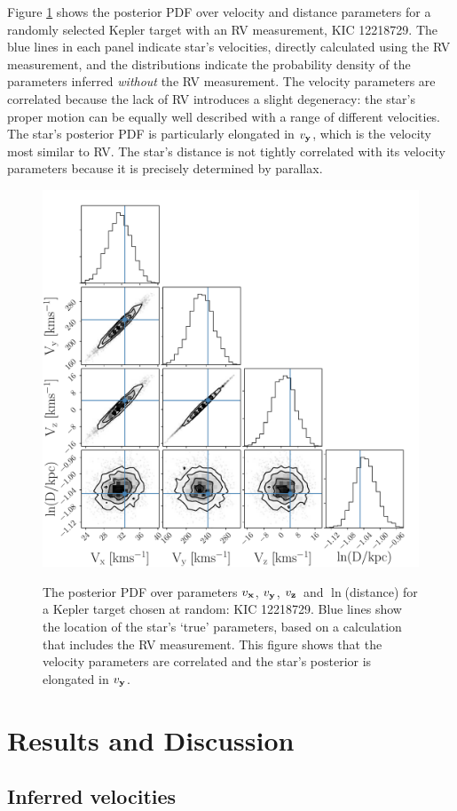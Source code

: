 \documentclass[]{aastex631}
\newcommand{\vx}{$v_{\bf x}$}
\newcommand{\vy}{$v_{\bf y}$}
\newcommand{\vz}{$v_{\bf z}$}
\newcommand{\kicstar}{12218729}
\begin{document}
Figure \ref{fig:posterior} shows the posterior PDF over velocity and distance
parameters for a randomly selected Kepler target with an RV measurement, KIC
\kicstar.
The blue lines in each panel indicate star's velocities, directly calculated
using the RV measurement, and the distributions indicate the probability
density of the parameters inferred {\it without} the RV measurement.
The velocity parameters are correlated because the lack of RV introduces a
slight degeneracy: the star's proper motion can be equally well described with
a range of different velocities.
The star's posterior PDF is particularly elongated in \vy, which is the
velocity most similar to RV.
The star's distance is not tightly correlated with its velocity parameters
because it is precisely determined by parallax.
\begin{figure}[ht!]
\caption{
The posterior PDF over parameters \vx, \vy, \vz\ and $\ln$(distance) for a
    Kepler target chosen at random: KIC \kicstar.
    Blue lines show the location of the star's `true' parameters, based on a
    calculation that includes the RV measurement.
This figure shows that the velocity parameters are correlated and the star's
    posterior is elongated in \vy.
    }
  \centering
    \includegraphics[width=.7\textwidth]{posterior}
\label{fig:posterior}
\end{figure}

\section{Results and Discussion}
\label{sec:results}

\subsection{Inferred velocities}
\end{document}
